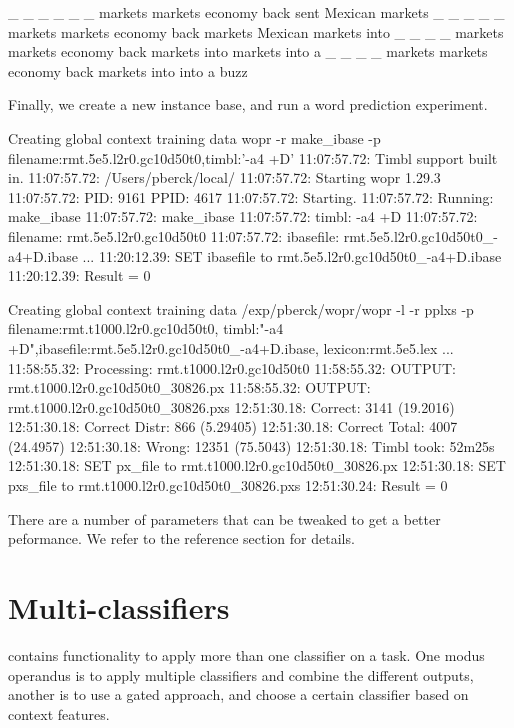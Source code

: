 \documentclass[a4paper,10pt,twoside]{report}
\begin{document}
\begin{wout}{}
_ _ _ _ _ _ markets markets economy back sent Mexican markets
_ _ _ _ _ markets markets economy back markets Mexican markets into
_ _ _ _ markets markets economy back markets into markets into a
_ _ _ _ markets markets economy back markets into into a buzz
\end{wout}

Finally, we create a new instance base, and run a word prediction
experiment.

\begin{bash}{Creating global context training data}
wopr -r make_ibase -p filename:rmt.5e5.l2r0.gc10d50t0,timbl:'-a4 +D'
11:07:57.72: Timbl support built in.
11:07:57.72: /Users/pberck/local/
11:07:57.72: Starting wopr 1.29.3
11:07:57.72: PID:   9161 PPID:   4617
11:07:57.72: Starting.
11:07:57.72: Running: make_ibase
11:07:57.72: make_ibase
11:07:57.72:  timbl:     -a4 +D
11:07:57.72:  filename:  rmt.5e5.l2r0.gc10d50t0
11:07:57.72:  ibasefile: rmt.5e5.l2r0.gc10d50t0_-a4+D.ibase
...
11:20:12.39: SET ibasefile to rmt.5e5.l2r0.gc10d50t0_-a4+D.ibase
11:20:12.39: Result = 0
\end{bash}

\begin{bash}{Creating global context training data}
/exp/pberck/wopr/wopr -l -r pplxs -p filename:rmt.t1000.l2r0.gc10d50t0,
              timbl:"-a4 +D",ibasefile:rmt.5e5.l2r0.gc10d50t0_-a4+D.ibase,
              lexicon:rmt.5e5.lex
...
11:58:55.32: Processing: rmt.t1000.l2r0.gc10d50t0
11:58:55.32: OUTPUT:     rmt.t1000.l2r0.gc10d50t0_30826.px
11:58:55.32: OUTPUT:     rmt.t1000.l2r0.gc10d50t0_30826.pxs
12:51:30.18:  Correct:       3141 (19.2016)
12:51:30.18:  Correct Distr: 866 (5.29405)
12:51:30.18:  Correct Total: 4007 (24.4957)
12:51:30.18:  Wrong:         12351 (75.5043)
12:51:30.18:  Timbl took: 52m25s
12:51:30.18:  SET px_file to rmt.t1000.l2r0.gc10d50t0_30826.px
12:51:30.18:  SET pxs_file to rmt.t1000.l2r0.gc10d50t0_30826.pxs
12:51:30.24: Result = 0
\end{bash}

There are a number of parameters that can be tweaked to get a better
peformance. We refer to the reference section for details.

\section{Multi-classifiers}

\Wopr{} contains functionality to apply more than one classifier on a
task. One modus operandus is to apply multiple classifiers and combine
the different outputs, another is to use a gated approach, and choose
a certain classifier based on context features.
\end{document}
